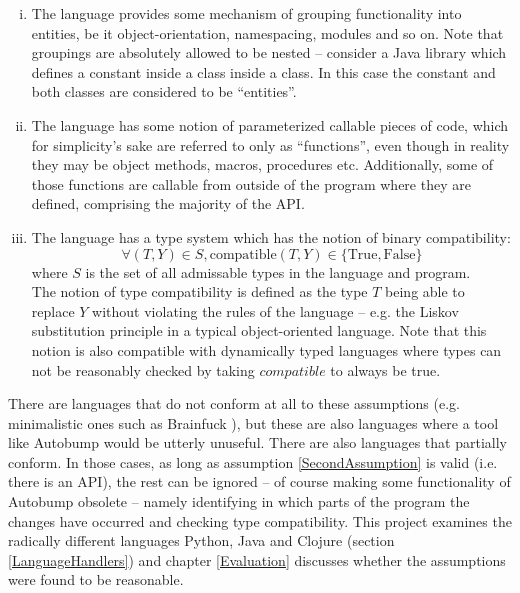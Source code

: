 \documentclass{l4proj}
\begin{document}
\begin{enumerate}[(i)]
\item The language provides some mechanism of grouping functionality
into entities, be it object-orientation, namespacing, modules and so
on. Note that groupings are absolutely allowed to be nested --
consider a Java library which defines a constant inside a class inside
a class. In this case the constant and both classes are considered to
be ``entities''.
\item The language has some notion of parameterized callable pieces of
code, which for simplicity's sake are referred to only as ``functions'',
even though in reality they may be object methods, macros, procedures etc.
Additionally, some of those functions are callable from outside of the
program where they are defined, comprising the majority of the API.
\label{SecondAssumption}
\item The language has a type system which has the notion of binary
compatibility:
\begin{equation}
\forall(T,Y) \in S, \mathrm{compatible}(T,Y) \in \{\mathrm{True},\mathrm{False}\}
\end{equation}
where $S$ is the set of all admissable types in the language and
program. \\

The notion of type compatibility is defined as the type $T$ being able
to replace $Y$ without violating the rules of the language -- e.g. the
Liskov substitution principle \cite{Liskov} in a typical
object-oriented language. Note that this notion is also compatible
with dynamically typed languages where types can not be reasonably
checked by taking $compatible$ to always be true.
\end{enumerate}

There are languages that do not conform at all to these assumptions
(e.g. minimalistic ones such as Brainfuck \cite{Brainfuck}), but these
are also languages where a tool like Autobump would be utterly
unuseful. There are also languages that partially conform. In those
cases, as long as assumption \ref{SecondAssumption} is valid (i.e.
there is an API), the rest can be ignored -- of course making some functionality
of Autobump obsolete -- namely identifying in which parts of
the program the changes have occurred and checking type compatibility.
This project examines the radically different languages
Python, Java and Clojure (section \ref{LanguageHandlers}) and chapter
\ref{Evaluation} discusses whether the assumptions were found to be
reasonable.
\end{document}

